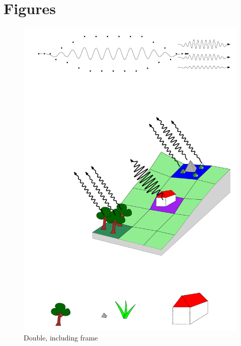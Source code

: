 \section{Figures}   

\begin{figure}[!hb]
	\centering 
	\includegraphics[width=0.45\linewidth,trim={2cm 6cm 0cm 8cm},clip]{figures/example1/figure} %
	\caption{Double, including frame}
	\label{fig:double_example1}
\end{figure}



